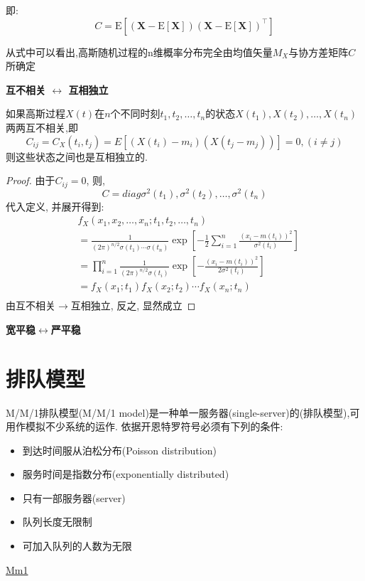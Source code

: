 \documentclass{article}
\begin{document}
即:
$$
C=\mathrm{E}
\left[
 \left(
 \textbf{X} - \mathrm{E}[\textbf{X}]
 \right)
 \left(
 \textbf{X} - \mathrm{E}[\textbf{X}]
 \right)^\top
\right]
$$

从式中可以看出,高斯随机过程的n维概率分布完全由均值矢量$M_X$与协方差矩阵$C$所确定

\textbf{互不相关 $\leftrightarrow$ 互相独立}
\begin{theorem}
如果高斯过程$X(t)$在$n$个不同时刻$t_1, t_2, \ldots, t_n$的状态$X(t_1), X(t_2), \ldots, X(t_n)$两两互不相关,即
$$
C_{ij} = C_X(t_i, t_j) = E[(X(t_i) - m_i)(X(t_j - m_j))] = 0, (i \neq j)
$$
则这些状态之间也是互相独立的.
\end{theorem}
\begin{proof}
由于$C_{ij} = 0$, 则, 
$$ C = diag{\sigma^2(t_1), \sigma^2(t_2), \ldots, \sigma^2(t_n)}$$
代入定义, 并展开得到:
$$
\begin{aligned}
& f_X(x_1, x_2, \ldots, x_n; t_1, t_2, \ldots, t_n) \\
& = \frac{1}{(2\pi)^{n/2} \sigma(t_1) \cdots \sigma(t_n)} \exp[-\frac{1}{2} \sum_{i=1}^n \frac{(x_i - m(t_i))^2}{\sigma^2(t_i)}]\\
& = \prod_{i=1}^n \frac{1}{(2\pi)^{n/2} \sigma(t_i)} \exp[-\frac{(x_i - m(t_i))^2}{2 \sigma^2(t_i)}]\\
& = f_X(x_1; t_1) f_X(x_2; t_2) \cdots f_X(x_n; t_n)\\
\end{aligned}
$$
由互不相关$\rightarrow$互相独立, 反之, 显然成立
\end{proof}

\textbf{宽平稳$\leftrightarrow$严平稳}
\begin{theorem}
\end{theorem}

\section{排队模型}
M/M/1排队模型(M/M/1 model)是一种单一服务器(single-server)的(排队模型),可用作模拟不少系统的运作.
依据开恩特罗符号必须有下列的条件:
\begin{itemize}
\item 到达时间服从泊松分布(Poisson distribution)
\item 服务时间是指数分布(exponentially distributed)
\item 只有一部服务器(server)
\item 队列长度无限制
\item 可加入队列的人数为无限
\end{itemize}
\href{http://upload.wikimedia.org/wikipedia/commons/thumb/6/65/Mm1\_queue.svg/292px-Mm1\_queue.svg.png}{Mm1}
\end{document}
